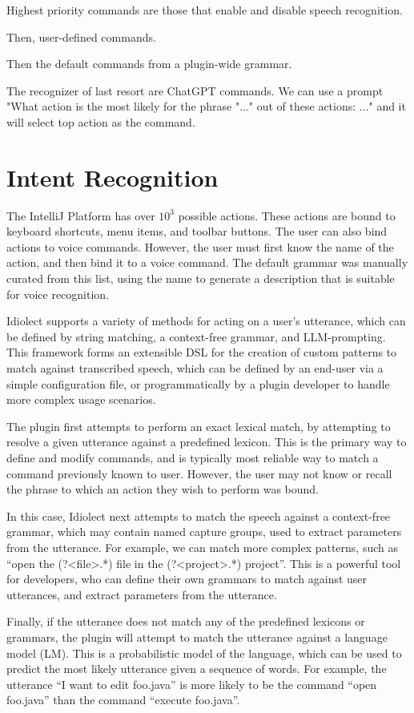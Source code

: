 \documentclass[conference]{IEEEtran}
\begin{document}
Highest priority commands are those that enable and disable speech recognition.

Then, user-defined commands.

Then the default commands from a plugin-wide grammar.

The recognizer of last resort are ChatGPT commands. We can use a prompt "What action is the most likely for the phrase "..." out of these actions: ..." and it will select top action as the command.

\section{Intent Recognition}

The IntelliJ Platform has over $10^3$ possible actions. These actions are bound to keyboard shortcuts, menu items, and toolbar buttons. The user can also bind actions to voice commands. However, the user must first know the name of the action, and then bind it to a voice command. The default grammar was manually curated from this list, using the name to generate a description that is suitable for voice recognition.

Idiolect supports a variety of methods for acting on a user's utterance, which can be defined by string matching, a context-free grammar, and LLM-prompting. This framework forms an extensible DSL for the creation of custom patterns to match against transcribed speech, which can be defined by an end-user via a simple configuration file, or programmatically by a plugin developer to handle more complex usage scenarios.

The plugin first attempts to perform an exact lexical match, by attempting to resolve a given utterance against a predefined lexicon. This is the primary way to define and modify commands, and is typically most reliable way to match a command previously known to user. However, the user may not know or recall the phrase to which an action they wish to perform was bound.

In this case, Idiolect next attempts to match the speech against a context-free grammar, which may contain named capture groups, used to extract parameters from the utterance. For example, we can match more complex patterns, such as ``open the (?<file>.*) file in the (?<project>.*) project''. This is a powerful tool for developers, who can define their own grammars to match against user utterances, and extract parameters from the utterance.

Finally, if the utterance does not match any of the predefined lexicons or grammars, the plugin will attempt to match the utterance against a language model (LM). This is a probabilistic model of the language, which can be used to predict the most likely utterance given a sequence of words. For example, the utterance ``I want to edit foo.java'' is more likely to be the command ``open foo.java'' than the command ``execute foo.java''.
\end{document}
